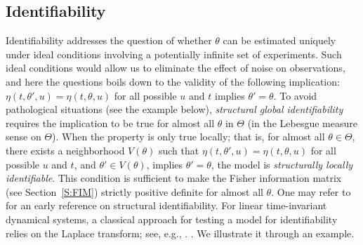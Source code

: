 \documentclass[twocolumn]{autart}
\theoremstyle{definition}
\theoremstyle{remark}
\begin{document}
\subsection{Identifiability}
Identifiability addresses the question of whether $\theta$ can be estimated uniquely under ideal conditions involving a potentially infinite set of experiments. Such ideal conditions would allow us to eliminate the effect of noise on observations, and here the questions boils down to the validity of the following implication: $\eta(t,\theta',u)=\eta(t,\theta,u)$ for all possible $u$ and $t$ implies $\theta'=\theta$. To avoid pathological situations (see the example below), {\em structural global identifiability} requires the implication to be true for almost all $\theta$ in $\Theta$ (in the Lebesgue measure sense on $\Theta$). When the property is only true locally; that is, for almost all $\theta\in\Theta$, there exists a neighborhood $V(\theta)$ such that $\eta(t,\theta',u)=\eta(t,\theta,u)$ for all possible $u$ and $t$, and $\theta'\in V(\theta)$, implies $\theta'=\theta$, the model is {\em structurally locally identifiable}. This condition is sufficient to make the Fisher information matrix (see Section~\ref{S:FIM}) strictly positive definite for almost all $\theta$. One may refer to \cite{KoopmansR50} for an early reference on structural identifiability. For linear time-invariant dynamical systems, a classical approach for testing a model for identifiability relies on the Laplace transform; see, e.g., \cite{BellmanA70}. \cite{WPl93}. 
We illustrate it through an example.
\end{document}
